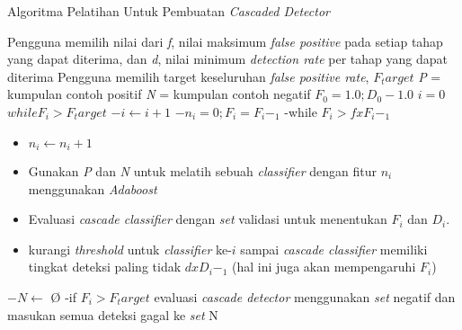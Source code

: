 \begin{algorithm}
  \caption{Algoritma Pelatihan Untuk Pembuatan \textit{Cascaded Detector}}
  \begin{algorithmic} [1]
    \State Pengguna memilih nilai dari \textit{f}, nilai maksimum \emph{false positive} 
    pada setiap tahap yang dapat diterima, dan \textit{d}, nilai minimum \emph{detection rate} 
    per tahap yang dapat diterima
    \State Pengguna memilih target keseluruhan \emph{false positive rate}, $F_target$
    \State \textit{P} = kumpulan contoh positif
    \State \textit{N} = kumpulan contoh negatif
    \State $F_0 = 1.0; D_0 - 1.0$
    \State $i = 0$
    \State $while F_i > F_target$
    \Statex $-i \leftarrow i + 1$
    \Statex $-n_i = 0; F_i = F_i-_1$
    \Statex -while $F_i > f x F_i-_1$
    \begin{itemize}
      \item $n_i \leftarrow n_i + 1$
      \item Gunakan \textit{P} dan \textit{N} untuk melatih sebuah \emph{classifier}
      dengan fitur $n_i$ menggunakan \emph{Adaboost} 
      \item Evaluasi \emph{cascade classifier} dengan \textit{set} validasi
      untuk menentukan $F_i$ dan $D_i$. 
      \item kurangi \textit{threshold} untuk \emph{classifier} ke-$i$ sampai 
      \emph{cascade classifier} memiliki tingkat deteksi paling tidak $d x D_i-_1$ 
      (hal ini juga akan mempengaruhi $F_i$)
    \end{itemize}
    \Statex $-N \leftarrow$ {\O}
    \Statex -if $F_i > F_target$ evaluasi \emph{cascade detector} menggunakan 
    \textit{set} negatif dan masukan semua deteksi gagal ke \textit{set} N
  \end{algorithmic}
\end{algorithm}

